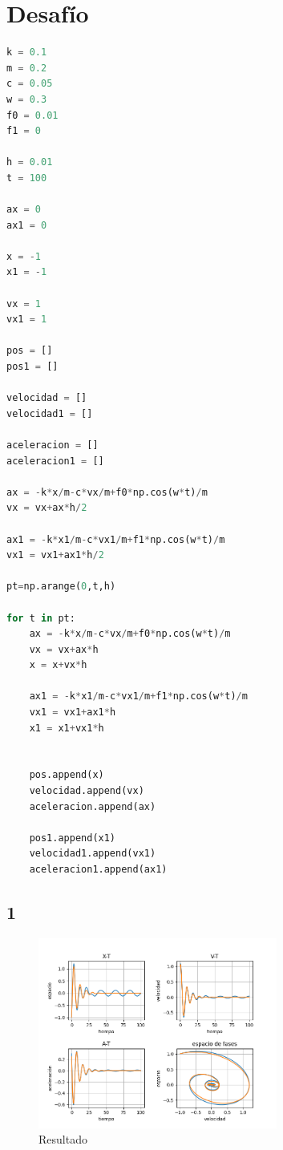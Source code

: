 \documentclass{article}
\begin{document}
\section{Desafío}
\begin{lstlisting}[language=Python,caption=Desafío 1.1]
k = 0.1
m = 0.2
c = 0.05
w = 0.3
f0 = 0.01
f1 = 0

h = 0.01
t = 100

ax = 0
ax1 = 0

x = -1
x1 = -1

vx = 1
vx1 = 1

pos = []
pos1 = []

velocidad = []
velocidad1 = []

aceleracion = []
aceleracion1 = []

ax = -k*x/m-c*vx/m+f0*np.cos(w*t)/m
vx = vx+ax*h/2

ax1 = -k*x1/m-c*vx1/m+f1*np.cos(w*t)/m
vx1 = vx1+ax1*h/2

pt=np.arange(0,t,h)

for t in pt:
    ax = -k*x/m-c*vx/m+f0*np.cos(w*t)/m
    vx = vx+ax*h
    x = x+vx*h
    
    ax1 = -k*x1/m-c*vx1/m+f1*np.cos(w*t)/m
    vx1 = vx1+ax1*h
    x1 = x1+vx1*h
    
   
    pos.append(x)
    velocidad.append(vx)
    aceleracion.append(ax)

    pos1.append(x1)
    velocidad1.append(vx1)
    aceleracion1.append(ax1)
\end{lstlisting}
\subsection{1}
\begin{figure}[H]
    \centering
    \includegraphics[width=0.7\textwidth]{desa1.png}
    \caption{Resultado}
\end{figure}
\end{document}
